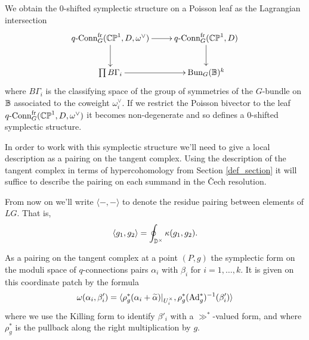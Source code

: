 \documentclass[10pt, oneside]{article}
\newcommand{\qconn}{q\text{-Conn}}
\newcommand{\fr}{\mathrm{fr}}
\newcommand{\Ad}{\mr{Ad}}
\begin{document}
\begin{construction}
We obtain the 0-shifted symplectic structure on a Poisson leaf as the Lagrangian intersection
\[\xymatrix{
\qconn_G^{\fr}(\bb{CP}^1, D, \omega^\vee) \ar[r] \ar[d] &\qconn_G^{\fr}(\bb{CP}^1, D) \ar[d] \\
\prod B\Gamma_i \ar[r] & \bun_G(\bb B)^k
}\]
where $B\Gamma_i$ is the classifying space of the group of symmetries of the $G$-bundle on $\mathbb{B}$ associated to the coweight $\omega^\vee_i$.  If we restrict the Poisson bivector to the leaf $\qconn_G^{\fr}(\bb{CP}^1, D, \omega^\vee)$ it becomes non-degenerate and so defines a 0-shifted symplectic structure.
\end{construction}

In order to work with this symplectic structure we'll need to give a local description as a pairing on the tangent complex.  Using the description of the tangent complex in terms of hypercohomology from Section \ref{def_section} it will suffice to describe the pairing on each summand in the \v Cech resolution.

\begin{remark}
From now on we'll write $\langle - , - \rangle$ to denote the residue pairing between elements of $LG$.  That is, 
\[\langle g_1, g_2 \rangle = \oint_{\mathbb{D}^\times} \kappa(g_1, g_2).\]
\end{remark}

\begin{lemma}
As a pairing on the tangent complex at a point $(P,g)$ the symplectic form on the moduli space of $q$-connections pairs $\alpha_i$ with $\beta_i$ for $i=1,\ldots,k$.  It is given on this coordinate patch by the formula 
\[\omega(\alpha_i, \beta_i') = \langle \rho_g^*(\alpha_i + \wt \alpha)|_{U^\times_i}, \rho_g^*(\Ad_g^*)^{-1}(\beta'_i) \rangle\]
where we use the Killing form to identify $\beta'_i$ with a $\gg^*$-valued form, and where $\rho_g^*$ is the pullback along the right multiplication by $g$.
\end{lemma}
\end{document}
